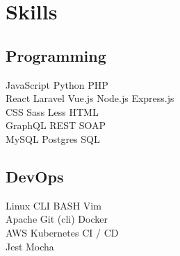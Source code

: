 \documentclass[]{pb-resume}
\begin{document}
\begin{minipage}[t]{0.33\textwidth}

\section{Skills}
\subsection{Programming}
JavaScript \textbullet{}  Python \textbullet{}  PHP \textbullet{}  \\
React \textbullet{}  Laravel \textbullet{}  Vue.js \textbullet{} 
Node.js \textbullet{}  Express.js \\ 
CSS \textbullet{} Sass \textbullet{} Less \textbullet{} HTML \\
GraphQL \textbullet{} REST \textbullet{}  SOAP\textbullet{} \\
MySQL\textbullet{}  Postgres\textbullet{}  SQL\textbullet{} \\
\sectionsep

\subsection{DevOps}
Linux CLI \textbullet{}  BASH \textbullet{}  Vim\textbullet{}  \\
Apache \textbullet{} Git (cli) \textbullet{} Docker \\
AWS \textbullet{} Kubernetes \textbullet{} CI / CD \textbullet{} \\
Jest \textbullet{} Mocha \textbullet{}  
\sectionsep

%
%

\end{minipage} 
\hfill
\end{document}
